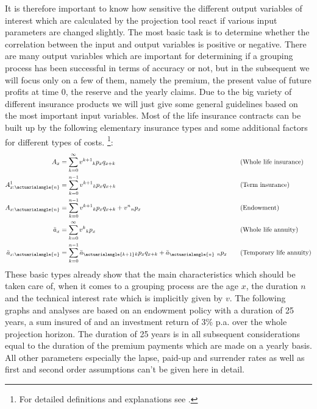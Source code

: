 It is therefore important to know how sensitive the different output variables of interest which are calculated by the projection tool react if various input parameters are changed slightly. The most basic task is to determine whether the correlation between the input and output variables is positive or negative. There are many output variables which are important for determining if a grouping process has been successful in terms of accuracy or not, but in the subsequent we will focus only on a few of them, namely the premium, the present value of future profits at time 0, the reserve and the yearly claims. Due to the big variety of different insurance products we will just give some general guidelines based on the most important input variables. Most of the life insurance contracts can be built up by the following elementary insurance types and some additional factors for different types of costs. \footnote{For detailed definitions and explanations see \cite{Gerber}.}:
\begin{alignat}{2}
\label{equ:whole_life}
A_x &=\sum_{k=0}^{\infty}v^{k+1} {}_{k}p_x q_{x+k} \quad \quad \quad &&\text{(Whole life insurance)}\\
A_{x:\actuarialangle{n}}^1 &=\sum_{k=0}^{n-1}v^{k+1} {}_{k}p_x q_{x+k} \quad \quad \quad  &&\text{(Term insurance)}\\
A_{x:\actuarialangle{n}} &=\sum_{k=0}^{n-1}v^{k+1} {}_{k}p_x q_{x+k} + v^n{}_{n}p_x\quad \quad &&\text{(Endowment)} \\
\ddot{a}_x &= \sum_{k=0}^{\infty} v^k {}_{k}p_x \quad &&\text{(Whole life annuity)} \\
\label{equ:temp_annuity}
\ddot{a}_{x:\actuarialangle{n}} &= \sum_{k=0}^{n-1} \ddot{a}_{\actuarialangle{k+1}} {}_{k}p_x q_{x+k} + \ddot{a}_{\actuarialangle{n}}~{}_{n}p_x  \quad &&\text{(Temporary life annuity)}
\end{alignat}
These basic types already show that the main characteristics which should be taken care of, when it comes to a grouping process are the age $x$, the duration $n$ and the technical interest rate which is implicitly given by $v$.  The following graphs and analyses are based on an endowment policy with a duration of 25 years, a sum insured of  and an investment return of 3\% p.a. over the whole projection horizon. The duration of 25 years is in all subsequent considerations equal to the duration of the premium payments which are made on a yearly basis. All other parameters especially the lapse, paid-up and surrender rates as well as first and second order assumptions can't be given here in detail. 

